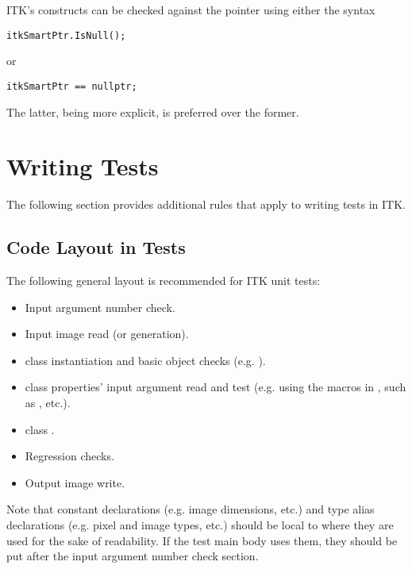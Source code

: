 ITK's  constructs can be checked against the 
pointer using either the syntax

\small
\begin{verbatim}
itkSmartPtr.IsNull();
\end{verbatim}
\normalsize

or

\small
\begin{verbatim}
itkSmartPtr == nullptr;
\end{verbatim}
\normalsize

The latter, being more explicit, is preferred over the former.

\section{Writing Tests}
\label{sec:WritingTests}

The following section provides additional rules that apply to writing tests
in ITK.


\subsection{Code Layout in Tests}
\label{subsec:CodeLayoutInTests}

The following general layout is recommended for ITK unit tests:
\begin{itemize}
\item Input argument number check.
\item Input image read (or generation).
\item {} class instantiation and basic object checks (e.g.
).
\item {} class properties' input argument read and test (e.g. using the
macros in , such as , etc.).
\item {} class .
\item Regression checks.
\item Output image write.
\end{itemize}

Note that constant declarations (e.g. image dimensions, etc.) and
type alias declarations (e.g. pixel and image types, etc.) should be local
to where they are used for the sake of readability. If the test main body uses
them, they should be put after the input argument number check section.


